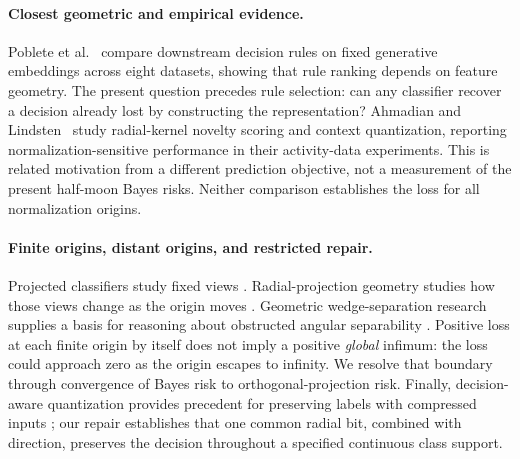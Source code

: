 {\paragraph{Closest geometric and empirical evidence.}
Poblete et al.~\citep{Poblete2026} compare downstream decision rules on fixed generative embeddings across eight datasets, showing that rule ranking depends on feature geometry. The present question precedes rule selection: can any classifier recover a decision already lost by constructing the representation? Ahmadian and Lindsten~\citep{Ahmadian2025} study radial-kernel novelty scoring and context quantization, reporting normalization-sensitive performance in their activity-data experiments. This is related motivation from a different prediction objective, not a measurement of the present half-moon Bayes risks. Neither comparison establishes the loss for all normalization origins.

\paragraph{Finite origins, distant origins, and restricted repair.}
Projected classifiers study fixed views \citep{Hamsici2007,Hamsici2008,Oh2025}. Radial-projection geometry studies how those views change as the origin moves \citep{Orponen2019}. Geometric wedge-separation research supplies a basis for reasoning about obstructed angular separability \citep{Hurtado2001}. Positive loss at each finite origin by itself does not imply a positive \emph{global} infimum: the loss could approach zero as the origin escapes to infinity. We resolve that boundary through convergence of Bayes risk to orthogonal-projection risk. Finally, decision-aware quantization provides precedent for preserving labels with compressed inputs \citep{OehlerGray1995,Senozan2024}; our repair establishes that one common radial bit, combined with direction, preserves the decision throughout a specified continuous class support.
}

